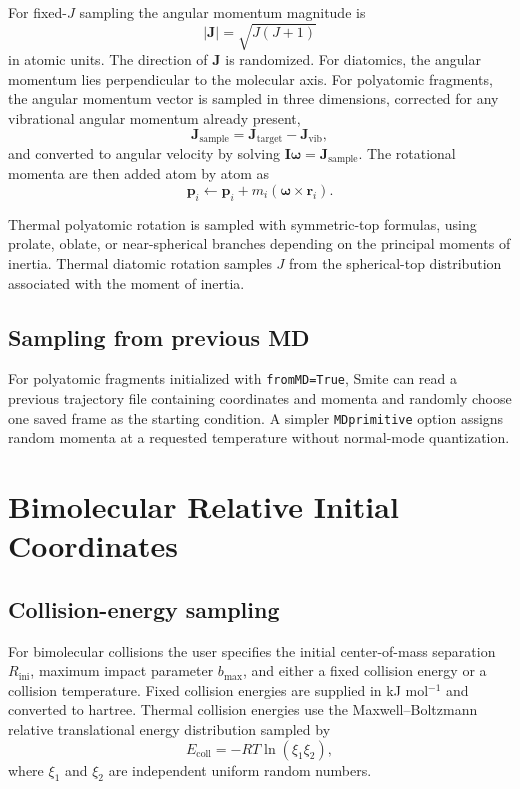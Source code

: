 \documentclass[11pt]{article}
\begin{document}
For fixed-$J$ sampling the angular momentum magnitude is
\begin{equation}
  |\mathbf{J}| = \sqrt{J(J+1)}
\end{equation}
in atomic units.  The direction of $\mathbf{J}$ is randomized.  For diatomics, the angular momentum lies perpendicular to the molecular axis.  For polyatomic fragments, the angular momentum vector is sampled in three dimensions, corrected for any vibrational angular momentum already present,
\begin{equation}
  \mathbf{J}_{\mathrm{sample}} =
  \mathbf{J}_{\mathrm{target}} - \mathbf{J}_{\mathrm{vib}},
\end{equation}
and converted to angular velocity by solving $\mathbf{I}\boldsymbol{\omega}=\mathbf{J}_{\mathrm{sample}}$.  The rotational momenta are then added atom by atom as
\begin{equation}
  \mathbf{p}_i \leftarrow \mathbf{p}_i + m_i(\boldsymbol{\omega}\times\mathbf{r}_i).
\end{equation}

Thermal polyatomic rotation is sampled with symmetric-top formulas, using prolate, oblate, or near-spherical branches depending on the principal moments of inertia.  Thermal diatomic rotation samples $J$ from the spherical-top distribution associated with the moment of inertia.

\subsection{Sampling from previous MD}

For polyatomic fragments initialized with \texttt{fromMD=True}, Smite can read a previous trajectory file containing coordinates and momenta and randomly choose one saved frame as the starting condition.  A simpler \texttt{MDprimitive} option assigns random momenta at a requested temperature without normal-mode quantization.

\section{Bimolecular Relative Initial Coordinates}

\subsection{Collision-energy sampling}

For bimolecular collisions the user specifies the initial center-of-mass separation $R_{\mathrm{ini}}$, maximum impact parameter $b_{\max}$, and either a fixed collision energy or a collision temperature.  Fixed collision energies are supplied in kJ mol$^{-1}$ and converted to hartree.  Thermal collision energies use the Maxwell--Boltzmann relative translational energy distribution sampled by
\begin{equation}
  E_{\mathrm{coll}} = -RT\ln(\xi_1\xi_2),
\end{equation}
where $\xi_1$ and $\xi_2$ are independent uniform random numbers.
\end{document}
